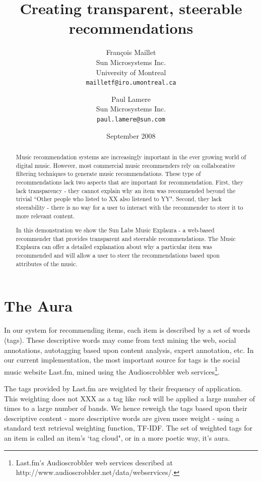 \documentclass[a4paper,10pt,twocolumn]{article}
\title{Creating transparent, steerable recommendations}
\author{
Fran\c{c}ois Maillet\\
Sun Microsystems Inc.\\
University of Montreal\\
\texttt{mailletf@iro.umontreal.ca}
\and 
Paul Lamere \\
Sun Microsystems Inc.\\
\texttt{paul.lamere@sun.com}
}
\date{September 2008}
\begin{document}
\maketitle

\begin{abstract}

Music recommendation systems are increasingly important in the ever 
    growing world of digital music.  However, most commercial music 
    recommenders rely on collaborative filtering techniques to generate 
    music recommendations. These type of recommendations lack two aspects 
    that are important for recommendation.  First, they lack transparency 
    - they cannot explain why an item was recommended beyond the trivial 
    ``Other people who listed to XX also listened to YY". Second, they 
    lack steerability - there is no way for a user to interact with the 
    recommender to steer it to more relevant content.
    
    In this demonstration we show the Sun Labs Music Explaura - a 
    web-based recommender that provides transparent and steerable 
    recommendations. The Music Explaura can offer a detailed explanation 
    about why a particular item was recommended and will allow a user to 
    steer the recommendations based upon attributes of the music.

\end{abstract}

\section{The Aura}

In our system for recommending items, each item is
described by a set of words (tags).  These
descriptive words may come from text mining the
web, social annotations, autotagging based upon
content analysis, expert annotation, etc. In our current 
implementation, the most important source for tags 
is the social music website Last.fm, mined using the
Audioscrobbler web services\footnote{Last.fm's Audioscrobbler web services described at http://www.audioscrobbler.net/data/webservices/.}.

The tags provided by Last.fm are weighted by their frequency 
of application. This weighting does not  XXX as a tag like \textit{rock} 
will be applied a large number of times to a large number of bands. 
We hence reweigh the tags based upon their descriptive
content - more descriptive words are given more
weight - using a standard text retrieval weighting function,
TF-IDF. The set of weighted tags for an item is called an
item's `tag cloud", or in a more poetic way, it's aura.
\end{document}
